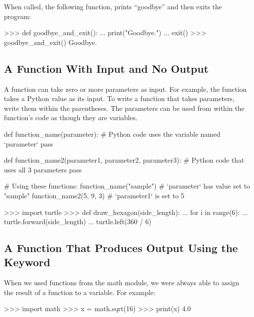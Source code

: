 \documentclass[11pt]{cselabheader}
\begin{document}
{When called, the following function, prints ``goodbye''
and then exits the program:

\begin{pyconcode}
>>> def goodbye_and_exit():
...     print("Goodbye.")
...     exit()
>>> goodbye_and_exit()
Goodbye.

\end{pyconcode}

\subsection{A Function With Input and No Output}

A function can take zero or more parameters as input.
For example, the  function takes a Python value
as its input.
To write a function that takes parameters, write them within the
parentheses.
The parameters can be used from within the function's code as though they
are variables.

\begin{python3code}
def function_name(parameter):
    # Python code uses the variable named `parameter`
    pass

def function_name2(parameter1, parameter2, parameter3):
    # Python code that uses all 3 parameters
    pass

# Using these functions:
function_name("sample")  # `parameter` has value set to "sample"
function_name2(5, 9, 3)  # `parameter1` is set to 5
\end{python3code}

\begin{pyconcode}
>>> import turtle
>>> def draw_hexagon(side_length):
...     for i in range(6):
...         turtle.forward(side_length)
...         turtle.left(360 / 6)

\end{pyconcode}


\subsection{A Function That Produces Output Using the  Keyword}

When we used functions from the math module, we were always able to assign the
result of a function to a variable. For example:

\begin{pyconcode}
>>> import math
>>> x = math.sqrt(16)
>>> print(x)
4.0

\end{pyconcode}

}
\end{document}
